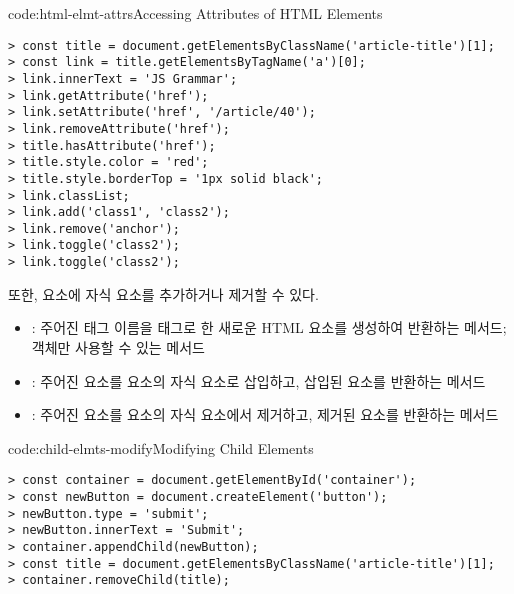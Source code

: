 \begin{codeenv}{code:html-elmt-attrs}{Accessing Attributes of HTML Elements}\begin{verbatim}
> const title = document.getElementsByClassName('article-title')[1];
> const link = title.getElementsByTagName('a')[0];
> link.innerText = 'JS Grammar';
> link.getAttribute('href');
> link.setAttribute('href', '/article/40');
> link.removeAttribute('href');
> title.hasAttribute('href');
> title.style.color = 'red';
> title.style.borderTop = '1px solid black';
> link.classList;
> link.add('class1', 'class2');
> link.remove('anchor');
> link.toggle('class2');
> link.toggle('class2');
\end{verbatim}
\end{codeenv}

또한, 요소에 자식 요소를 추가하거나 제거할 수 있다.

\begin{itemize}
    \item {}: 주어진 태그 이름을 태그로 한 새로운 HTML 요소를 생성하여 반환하는 메서드;  객체만 사용할 수 있는 메서드
    \item {}: 주어진 요소를 요소의 자식 요소로 삽입하고, 삽입된 요소를 반환하는 메서드
    \item {}: 주어진 요소를 요소의 자식 요소에서 제거하고, 제거된 요소를 반환하는 메서드
\end{itemize}

\begin{codeenv}{code:child-elmts-modify}{Modifying Child Elements}\begin{verbatim}
> const container = document.getElementById('container');
> const newButton = document.createElement('button');
> newButton.type = 'submit';
> newButton.innerText = 'Submit';
> container.appendChild(newButton);
> const title = document.getElementsByClassName('article-title')[1];
> container.removeChild(title);
\end{verbatim}
\end{codeenv}
